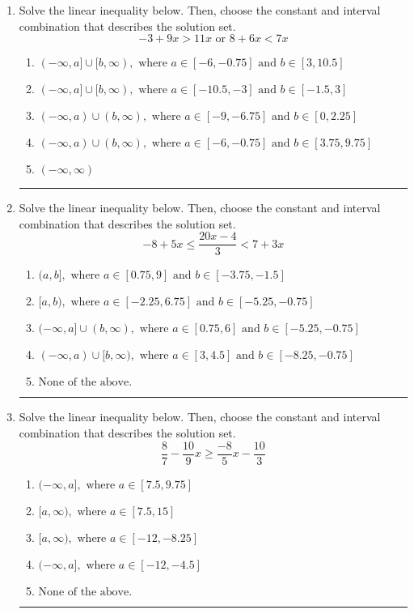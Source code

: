 \documentclass[14pt]{extbook}
\newcommand{\litem}[1]{\item#1\hspace*{-1cm}\rule{\textwidth}{0.4pt}}
\begin{document}
\begin{enumerate}
{\begin{enumerate}[label=\Alph*.]
\end{enumerate} }
\litem{
Solve the linear inequality below. Then, choose the constant and interval combination that describes the solution set.\[ -3 + 9 x > 11 x \text{ or } 8 + 6 x < 7 x \]\begin{enumerate}[label=\Alph*.]
\item \( (-\infty, a] \cup [b, \infty), \text{ where } a \in [-6, -0.75] \text{ and } b \in [3, 10.5] \)
\item \( (-\infty, a] \cup [b, \infty), \text{ where } a \in [-10.5, -3] \text{ and } b \in [-1.5, 3] \)
\item \( (-\infty, a) \cup (b, \infty), \text{ where } a \in [-9, -6.75] \text{ and } b \in [0, 2.25] \)
\item \( (-\infty, a) \cup (b, \infty), \text{ where } a \in [-6, -0.75] \text{ and } b \in [3.75, 9.75] \)
\item \( (-\infty, \infty) \)

\end{enumerate} }
\litem{
Solve the linear inequality below. Then, choose the constant and interval combination that describes the solution set.\[ -8 + 5 x \leq \frac{20 x - 4}{3} < 7 + 3 x \]\begin{enumerate}[label=\Alph*.]
\item \( (a, b], \text{ where } a \in [0.75, 9] \text{ and } b \in [-3.75, -1.5] \)
\item \( [a, b), \text{ where } a \in [-2.25, 6.75] \text{ and } b \in [-5.25, -0.75] \)
\item \( (-\infty, a] \cup (b, \infty), \text{ where } a \in [0.75, 6] \text{ and } b \in [-5.25, -0.75] \)
\item \( (-\infty, a) \cup [b, \infty), \text{ where } a \in [3, 4.5] \text{ and } b \in [-8.25, -0.75] \)
\item \( \text{None of the above.} \)

\end{enumerate} }
\litem{
Solve the linear inequality below. Then, choose the constant and interval combination that describes the solution set.\[ \frac{8}{7} - \frac{10}{9} x \geq \frac{-8}{5} x - \frac{10}{3} \]\begin{enumerate}[label=\Alph*.]
\item \( (-\infty, a], \text{ where } a \in [7.5, 9.75] \)
\item \( [a, \infty), \text{ where } a \in [7.5, 15] \)
\item \( [a, \infty), \text{ where } a \in [-12, -8.25] \)
\item \( (-\infty, a], \text{ where } a \in [-12, -4.5] \)
\item \( \text{None of the above}. \)


\end{enumerate}}
\end{enumerate}
\end{document}
